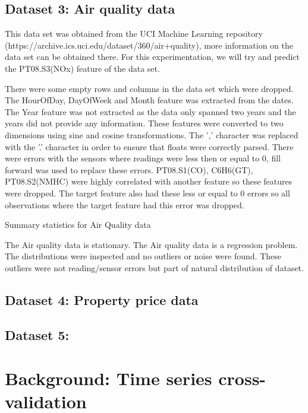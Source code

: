 \documentclass[conference]{IEEEtran}
\begin{document}
\subsection{Dataset 3: Air quality data}

This data set was obtained from the UCI Machine Learning repository (https://archive.ics.uci.edu/dataset/360/air+quality), more information on the data set can be obtained there. For this experimentation, we will try and predict the PT08.S3(NOx) feature of the data set.

There were some empty rows and columns in the data set which were dropped. The HourOfDay, DayOfWeek and Month feature was extracted from the dates. The Year feature was not extracted as the data only spanned two years and the years did not provide any information. These features were converted to two dimensions using sine and cosine transformations. The ',' character was replaced with the '.' character in order to ensure that floats were correctly parsed. There were errors with the sensors where readings were less then or equal to 0, fill forward was used to replace these errors. PT08.S1(CO), C6H6(GT), PT08.S2(NMHC) were highly correlated with another feature so these features were dropped. The target feature also had these less or equal to 0 errors so all observations where the target feature had this error was dropped.

\begin{table}[htbp]
	\centering
	\caption{Summary statistics for Air Quality data}
	\label{tab:aq-stats}
\end{table}


The Air quality data is stationary. The Air quality data is a regression problem. The distributions were inspected and no outliers or noise were found. These outliers were not reading/sensor errors but part of natural distribution of dataset. 
\subsection{Dataset 4: Property price data}



\subsection{Dataset 5: }

\section{Background: Time series cross-validation}
\end{document}
